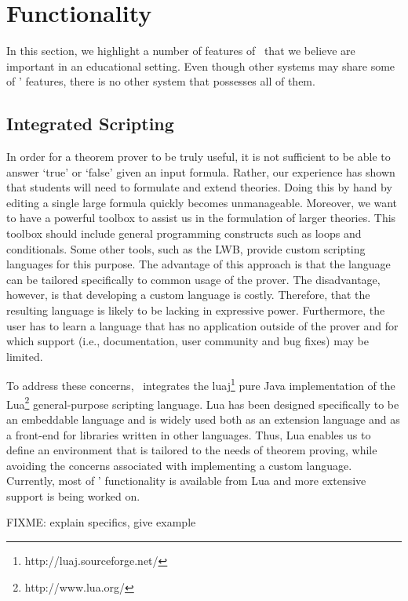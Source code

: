 \section{Functionality}
\label{sec:features}

In this section, we highlight a number of features of \oops\ that we believe
are important in an educational setting. Even though other systems may share
some of \oops' features, there is no other system that possesses all of them.

\subsection{Integrated Scripting}

In order for a theorem prover to be truly useful, it is not sufficient to be
able to answer `true' or `false' given an input formula. Rather, our
experience has shown that students will need to formulate and extend theories.
Doing this by hand by editing a single large formula quickly becomes
unmanageable.
Moreover, we want to have a powerful toolbox to assist us in the formulation
of larger theories.
This toolbox should include general programming constructs such as
loops and conditionals. Some other tools, such as the LWB, provide custom
scripting languages for this purpose. The advantage of this approach is that
the language can be tailored specifically to common usage of the prover. The
disadvantage, however, is that developing a custom language is costly.
Therefore, that the resulting language is likely to be lacking in expressive
power.
Furthermore, the user has to learn a language that has no application outside
of the prover and for which support (i.e., documentation, user community and
bug fixes) may be limited.

To address these concerns, \oops\ integrates the
luaj\footnote{http://luaj.sourceforge.net/} pure Java implementation of the
Lua\footnote{http://www.lua.org/} general-purpose scripting language. Lua has
been designed specifically to be an embeddable language and is widely used
both as an extension language and as a front-end for libraries written in
other languages.
Thus, Lua enables us to define an environment that is tailored to the needs of
theorem proving, while avoiding the concerns associated with implementing a
custom language.
Currently, most of \oops' functionality is available from Lua and more
extensive support is being worked on.

FIXME: explain specifics, give example

